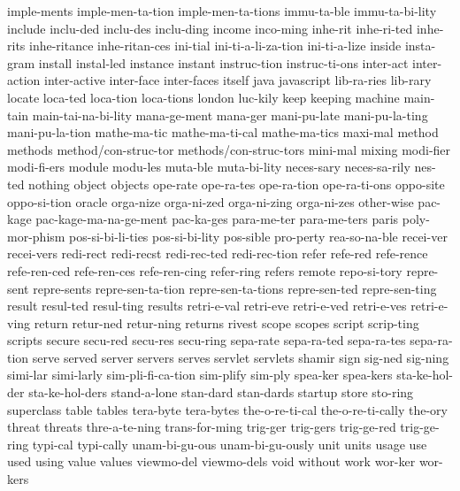 {    imple-ments
    imple-men-ta-tion
    imple-men-ta-tions
    immu-ta-ble
    immu-ta-bi-lity
    include
    inclu-ded
    inclu-des
    inclu-ding
    income
    inco-ming
    inhe-rit
    inhe-ri-ted
    inhe-rits
    inhe-ritance
    inhe-ritan-ces
    ini-tial
    ini-ti-a-li-za-tion
    ini-ti-a-lize
    inside
    insta-gram
    install
    instal-led
    instance
    instant
    instruc-tion
    instruc-ti-ons
    inter-act
    inter-action
    inter-active
    inter-face
    inter-faces
    itself
    java
    javascript
    lib-ra-ries
    lib-rary
    locate
    loca-ted
    loca-tion
    loca-tions
    london
    luc-kily
    keep
    keeping
    machine
    main-tain
    main-tai-na-bi-lity
    mana-ge-ment
    mana-ger
    mani-pu-late
    mani-pu-la-ting
    mani-pu-la-tion
    mathe-ma-tic
    mathe-ma-ti-cal
    mathe-ma-tics
    maxi-mal
    method
    methods
    method/con-struc-tor
    methods/con-struc-tors
    mini-mal
    mixing
    modi-fier
    modi-fi-ers
    module
    modu-les
    muta-ble
    muta-bi-lity
    neces-sary
    neces-sa-rily
    nes-ted
    nothing
    object
    objects
    ope-rate
    ope-ra-tes
    ope-ra-tion
    ope-ra-ti-ons
    oppo-site
    oppo-si-tion
    oracle
    orga-nize
    orga-ni-zed
    orga-ni-zing
    orga-ni-zes
    other-wise
    pac-kage
    pac-kage-ma-na-ge-ment
    pac-ka-ges
    para-me-ter
    para-me-ters
    paris
    poly-mor-phism
    pos-si-bi-li-ties
    pos-si-bi-lity
    pos-sible
    pro-perty
    rea-so-na-ble
    recei-ver
    recei-vers
    redi-rect
    redi-recst
    redi-rec-ted
    redi-rec-tion
    refer
    refe-red
    refe-rence
    refe-ren-ced
    refe-ren-ces
    refe-ren-cing
    refer-ring
    refers
    remote
    repo-si-tory
    repre-sent
    repre-sents
    repre-sen-ta-tion
    repre-sen-ta-tions
    repre-sen-ted
    repre-sen-ting
    result
    resul-ted
    resul-ting
    results
    retri-e-val
    retri-eve
    retri-e-ved
    retri-e-ves
    retri-e-ving
    return
    retur-ned
    retur-ning
    returns
    rivest
    scope
    scopes
    script
    scrip-ting
    scripts
    secure
    secu-red
    secu-res
    secu-ring
    sepa-rate
    sepa-ra-ted
    sepa-ra-tes
    sepa-ra-tion
    serve
    served
    server
    servers
    serves
    servlet
    servlets
    shamir
    sign
    sig-ned
    sig-ning
    simi-lar
    simi-larly
    sim-pli-fi-ca-tion
    sim-plify
    sim-ply
    spea-ker
    spea-kers
    sta-ke-hol-der
    sta-ke-hol-ders
    stand-a-lone
    stan-dard
    stan-dards
    startup
    store
    sto-ring
    superclass
    table
    tables
    tera-byte
    tera-bytes
    the-o-re-ti-cal
    the-o-re-ti-cally
    the-ory
    threat
    threats
    thre-a-te-ning
    trans-for-ming
    trig-ger
    trig-gers
    trig-ge-red
    trig-ge-ring
    typi-cal
    typi-cally
    unam-bi-gu-ous
    unam-bi-gu-ously
    unit
    units
    usage
    use
    used
    using
    value
    values
    viewmo-del
    viewmo-dels
    void
    without
    work
    wor-ker
    wor-kers
}
